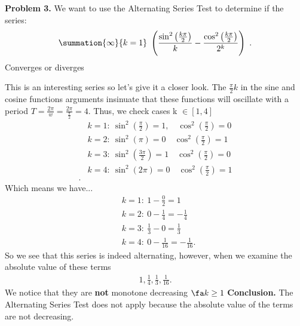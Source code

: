 \documentclass{report}
\begin{document}
        \pagebreak 
    \begin{mdframed}
        \textbf{Problem 3.} We want to use the Alternating Series Test to determine if the series:
        \begin{align*}
            \summation{\infty}{k=1}\ \left(\frac{\sin^{2}{\left(\frac{k\pi}{2}\right)}}{k} - \frac{\cos^{2}{\left(\frac{k\pi}{2}\right)}}{2^{k}}\right)\ 
        .\end{align*}
        Converges or diverges
    \end{mdframed}
    \bigbreak \noindent 
    This is an interesting series so let's give it a closer look. The $\frac{\pi}{2}k$ in the sine and cosine functions arguments insinuate that these functions will oscillate with a period $T = \frac{2\pi}{w} = \frac{2\pi}{\frac{\pi}{2}}  = 4$. Thus, we check cases k $\in [1,4]$
    \begin{align*}
        &k=1:\ \sin^{2}{\left(\frac{\pi}{2}\right)} = 1, \quad \cos^{2}{\left(\frac{\pi}{2}\right)} = 0\\
        &k=2:\ \sin^{2}{\left(\pi\right)} = 0 \quad \cos^{2}{\left(\frac{\pi}{2}\right)} = 1\\
        &k=3:\ \sin^{2}{\left(\frac{3\pi}{2}\right)} = 1 \quad \cos^{2}{\left(\frac{\pi}{2}\right)} = 0\\
        &k=4:\ \sin^{2}{\left(2\pi\right)} = 0 \quad \cos^{2}{\left(\frac{\pi}{2}\right)} = 1\\
    .\end{align*}
    Which means we have...
    \begin{align*}
        &k=1:\ 1 - \frac{0}{2} = 1 \\
        &k=2:\ 0 - \frac{1}{4} = -\frac{1}{4} \\
        &k=3:\ \frac{1}{3} - 0 = \frac{1}{3} \\
        &k=4:\ 0 - \frac{1}{16} = -\frac{1}{16}
    .\end{align*}
    \bigbreak \noindent 
    So we see that this series is indeed alternating, however, when we examine the absolute value of these terms
    \begin{align*}
        1, \frac{1}{4}, \frac{1}{3}, \frac{1}{16}
    .\end{align*}
    \bigbreak \noindent 
    We notice that they are \textbf{not} monotone decreasing $\fa k \geq 1 $
    \bigbreak \noindent 
    \textbf{Conclusion.} The Alternating Series Test does not apply because the absolute value of the terms are not decreasing.
\end{document}
